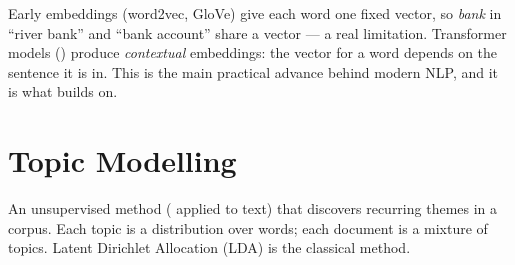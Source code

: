\begin{conceptbox}
Early embeddings (word2vec, GloVe) give each word one fixed vector, so
\emph{bank} in ``river bank'' and ``bank account'' share a vector --- a real
limitation. Transformer models () produce \emph{contextual}
embeddings: the vector for a word depends on the sentence it is in. This is the
main practical advance behind modern NLP, and it is what  builds on.
\end{conceptbox}

\section{Topic Modelling}

\begin{definitionbox}
An unsupervised method ( applied to text) that discovers
recurring themes in a corpus. Each topic is a distribution over words; each
document is a mixture of topics. Latent Dirichlet Allocation (LDA) is the classical
method.
\end{definitionbox}

